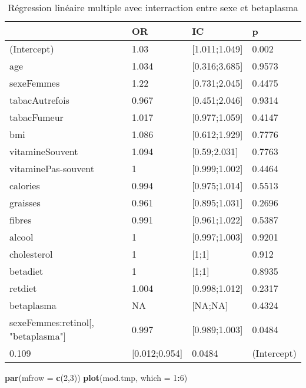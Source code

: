 \documentclass[]{article}
\newenvironment{Shaded}{\begin{snugshade}}{\end{snugshade}}
\newcommand{\KeywordTok}[1]{\textcolor[rgb]{0.13,0.29,0.53}{\textbf{#1}}}
\newcommand{\DataTypeTok}[1]{\textcolor[rgb]{0.13,0.29,0.53}{#1}}
\newcommand{\DecValTok}[1]{\textcolor[rgb]{0.00,0.00,0.81}{#1}}
\newcommand{\OperatorTok}[1]{\textcolor[rgb]{0.81,0.36,0.00}{\textbf{#1}}}
\newcommand{\NormalTok}[1]{#1}
\begin{document}
\begin{table}

\caption{\label{tab:unnamed-chunk-84}Régression linéaire multiple avec interraction entre sexe et betaplasma}
\centering
\begin{tabular}[t]{l|l|l|l}
\hline
  & OR & IC & p\\
\hline
\rowcolor[HTML]{BBD2E1}  (Intercept) & 1.03 & [1.011;1.049] & 0.002\\
\hline
age & 1.034 & [0.316;3.685] & 0.9573\\
\hline
\rowcolor[HTML]{BBD2E1}  sexeFemmes & 1.22 & [0.731;2.045] & 0.4475\\
\hline
tabacAutrefois & 0.967 & [0.451;2.046] & 0.9314\\
\hline
\rowcolor[HTML]{BBD2E1}  tabacFumeur & 1.017 & [0.977;1.059] & 0.4147\\
\hline
bmi & 1.086 & [0.612;1.929] & 0.7776\\
\hline
\rowcolor[HTML]{BBD2E1}  vitamineSouvent & 1.094 & [0.59;2.031] & 0.7763\\
\hline
vitaminePas-souvent & 1 & [0.999;1.002] & 0.4464\\
\hline
\rowcolor[HTML]{BBD2E1}  calories & 0.994 & [0.975;1.014] & 0.5513\\
\hline
graisses & 0.961 & [0.895;1.031] & 0.2696\\
\hline
\rowcolor[HTML]{BBD2E1}  fibres & 0.991 & [0.961;1.022] & 0.5387\\
\hline
alcool & 1 & [0.997;1.003] & 0.9201\\
\hline
\rowcolor[HTML]{BBD2E1}  cholesterol & 1 & [1;1] & 0.912\\
\hline
betadiet & 1 & [1;1] & 0.8935\\
\hline
\rowcolor[HTML]{BBD2E1}  retdiet & 1.004 & [0.998;1.012] & 0.2317\\
\hline
betaplasma & NA & [NA;NA] & 0.4324\\
\hline
\rowcolor[HTML]{BBD2E1}  sexeFemmes:retinol[, "betaplasma"] & 0.997 & [0.989;1.003] & 0.0484\\
\hline
0.109 & [0.012;0.954] & 0.0484 & (Intercept)\\
\hline
\end{tabular}
\end{table}

\begin{Shaded}
\begin{Highlighting}[]
\KeywordTok{par}\NormalTok{(}\DataTypeTok{mfrow =} \KeywordTok{c}\NormalTok{(}\DecValTok{2}\NormalTok{,}\DecValTok{3}\NormalTok{))}
\KeywordTok{plot}\NormalTok{(mod.tmp, }\DataTypeTok{which =} \DecValTok{1}\OperatorTok{:}\DecValTok{6}\NormalTok{)}
\end{Highlighting}
\end{Shaded}
\end{document}

